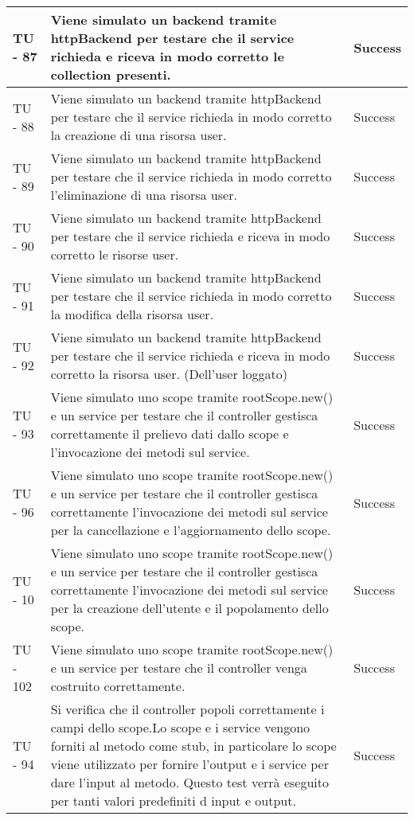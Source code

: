 \begin{center}
\begin{longtable}{ | p{3cm} | p{9cm} | p{2cm} | }
TU - 87 & Viene simulato un backend tramite httpBackend per testare che il service richieda e riceva in modo corretto le collection presenti. & Success \\ \hline
TU - 88 & Viene simulato un backend tramite httpBackend per testare che il service richieda in modo corretto la creazione di una risorsa user. & Success \\ \hline
TU - 89 & Viene simulato un backend tramite httpBackend per testare che il service richieda in modo corretto l'eliminazione di una risorsa user. & Success \\ \hline
TU - 90 & Viene simulato un backend tramite httpBackend per testare che il service richieda e riceva in modo corretto le risorse user. & Success \\ \hline
TU - 91 & Viene simulato un backend tramite httpBackend per testare che il service richieda in modo corretto la modifica della risorsa user. & Success \\ \hline
TU - 92 & Viene simulato un backend tramite httpBackend per testare che il service richieda e riceva in modo corretto la risorsa user. (Dell'user loggato) & Success \\ \hline
TU - 93 & Viene simulato uno scope tramite rootScope.new() e un service per testare che il controller gestisca correttamente il prelievo dati dallo scope e l'invocazione dei metodi sul service. & Success \\ \hline
TU - 96 & Viene simulato uno scope tramite rootScope.new() e un service per testare che il controller gestisca correttamente l'invocazione dei metodi sul service per la cancellazione e l'aggiornamento dello scope. & Success \\ \hline
TU - 10 & Viene simulato uno scope tramite rootScope.new() e un service per testare che il controller gestisca correttamente l'invocazione dei metodi sul service per la creazione dell'utente e il popolamento dello scope. & Success \\ \hline
TU - 102 & Viene simulato uno scope tramite rootScope.new() e un service per testare che il controller venga costruito correttamente.
 & Success \\ \hline
TU - 94 & Si verifica che il controller popoli correttamente i campi dello scope.Lo scope e i service vengono forniti al metodo come stub, in particolare lo scope viene utilizzato per fornire l'output e i service per dare l'input al metodo. Questo test verrà eseguito per tanti valori predefiniti d input e output. & Success \\ \hline

\end{longtable}
\end{center}
